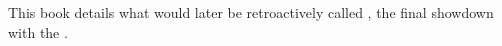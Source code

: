 \chapter[Twilight Angel, Remember]{\TwilightAngelRemember}
 

























\chapter{\TheKenosis}
























\chapter{\RamielsAwakeningBook}
















\chapter{\ThirdBanewarBook}
This book details what would later be retroactively called \thirdbanewar, the final showdown with the \banes. 















